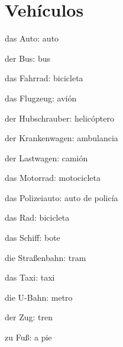 \section{Vehículos}
\begin{multicols}{2}
\begin{myitemize}
\item das Auto: auto
\item der Bus: bus
\item das Fahrrad: bicicleta
\item das Flugzeug: avión
\item der Hubschrauber: helicóptero
\item der Krankenwagen: ambulancia
\item der Lastwagen: camión
\item das Motorrad: motocicleta
\item das Polizeiauto: auto de policía
\item das Rad: bicicleta
\item das Schiff: bote
\item die Straßenbahn: tram
\item das Taxi: taxi
\item die U-Bahn: metro
\item der Zug: tren
\item zu Fuß: a pie
\end{myitemize}
\end{multicols}